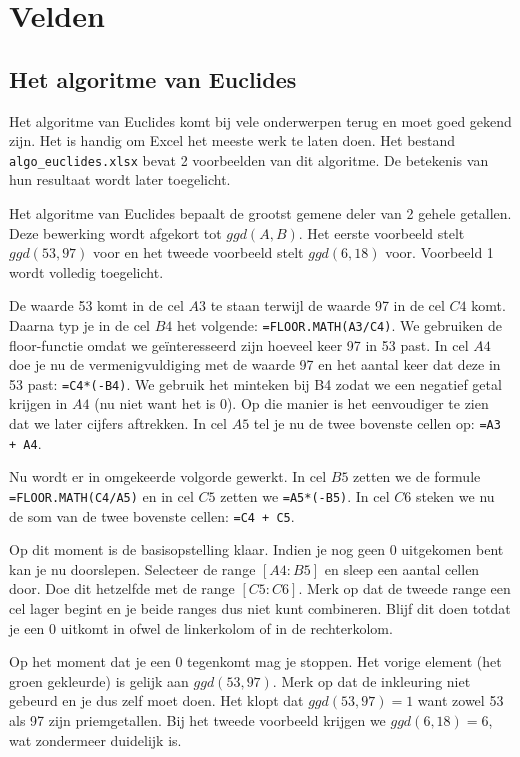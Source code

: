 \section{Velden}
\subsection{Het algoritme van Euclides}
Het algoritme van Euclides komt bij vele onderwerpen terug en moet goed gekend zijn. Het is handig om Excel het meeste werk te laten doen. Het bestand \texttt{algo\_euclides.xlsx} bevat 2 voorbeelden van dit algoritme. De betekenis van hun resultaat wordt later toegelicht. 

Het algoritme van Euclides bepaalt de grootst gemene deler van 2 gehele getallen. Deze bewerking wordt afgekort tot $ggd(A,B)$. Het eerste voorbeeld stelt $ggd(53, 97)$ voor en het tweede voorbeeld stelt $ggd(6, 18)$ voor. Voorbeeld 1 wordt volledig toegelicht.

De waarde 53 komt in de cel $A3$ te staan terwijl de waarde 97 in de cel $C4$ komt. Daarna typ je in de cel $B4$ het volgende: \texttt{=FLOOR.MATH(A3/C4)}. We gebruiken de floor-functie omdat we geïnteresseerd zijn hoeveel keer 97 in 53 past. In cel $A4$ doe je nu de vermenigvuldiging met de waarde 97 en het aantal keer dat deze in 53 past: \texttt{=C4*(-B4)}. We gebruik het minteken bij B4 zodat we een negatief getal krijgen in $A4$ (nu niet want het is 0). Op die manier is het eenvoudiger te zien dat we later cijfers aftrekken. In cel $A5$ tel je nu de twee bovenste cellen op: \texttt{=A3 + A4}. 

Nu wordt er in omgekeerde volgorde gewerkt. In cel $B5$ zetten we de formule \texttt{=FLOOR.MATH(C4/A5)} en in cel $C5$ zetten we \texttt{=A5*(-B5)}. In cel $C6$ steken we nu de som van de twee bovenste cellen: \texttt{=C4 + C5}.

Op dit moment is de basisopstelling klaar. Indien je nog geen 0 uitgekomen bent kan je nu doorslepen. Selecteer de range $[A4:B5]$ en sleep een aantal cellen door. Doe dit hetzelfde met de range $[C5:C6]$. Merk op dat de tweede range een cel lager begint en je beide ranges dus niet kunt combineren. Blijf dit doen totdat je een 0 uitkomt in ofwel de linkerkolom of in de rechterkolom.

Op het moment dat je een 0 tegenkomt mag je stoppen. Het vorige element (het groen gekleurde) is gelijk aan $ggd(53, 97)$. Merk op dat de inkleuring niet gebeurd en je dus zelf moet doen. Het klopt dat $ggd(53, 97) = 1$ want zowel 53 als 97 zijn priemgetallen. Bij het tweede voorbeeld krijgen we $ggd(6, 18) = 6$, wat zondermeer duidelijk is.
